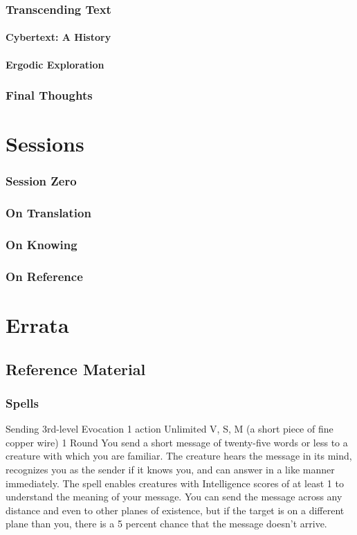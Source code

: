 \documentclass[10pt,twoside,twocolumn,openany,nomultitoc]{book}
\begin{document}
\section{Transcending Text}
    \lipsum[6]
\subsection{Cybertext: A History}
    \lipsum[3]
\subsection{Ergodic Exploration}
    \lipsum[4]
\section{Final Thoughts}
    \lipsum[5]



\part{Sessions}
\section{Session Zero}
\section{On Translation}
    \lipsum[1]
\section{On Knowing}
    \lipsum[2]
\section{On Reference}
    \lipsum[3]
    
\part{Errata}
\chapter{Reference Material}

\section{Spells}
    \DndSpellHeader%
      {Sending}
      {3rd-level Evocation}
      {1 action}
      {Unlimited}
      {V, S, M (a short piece of fine copper wire)}
      {1 Round}
            You send a short message of twenty-five words or less to a creature with which you are familiar. The creature hears the message in its mind, recognizes you as the sender if it knows you, and can answer in a like manner immediately. The spell enables creatures with Intelligence scores of at least 1 to understand the meaning of your message.
            You can send the message across any distance and even to other planes of existence, but if the target is on a different plane than you, there is a 5 percent chance that the message doesn't arrive.
            
\end{document}

